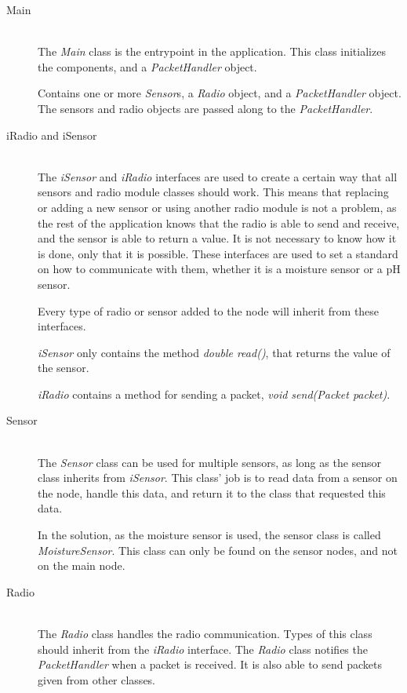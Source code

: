 \begin{description}
\item[Main] \hfill \\
The \textit{Main} class is the entrypoint in the application. This class initializes the components, and a \textit{PacketHandler} object.

Contains one or more \textit{Sensor}s, a \textit{Radio} object, and a \textit{PacketHandler} object. The sensors and radio objects are passed along to the \textit{PacketHandler}.

\item[iRadio and iSensor] \hfill \\
The \textit{iSensor} and \textit{iRadio} interfaces are used to create a certain way that all sensors and radio module classes should work. This means that replacing or adding a new sensor or using another radio module is not a problem, as the rest of the application knows that the radio is able to send and receive, and the sensor is able to return a value. 
It is not necessary to know how it is done, only that it is possible. These interfaces are used to set a standard on how to communicate with them, whether it is a moisture sensor or a pH sensor.

Every type of radio or sensor added to the node will inherit from these interfaces.


\textit{iSensor} only contains the method \textit{double read()}, that returns the value of the sensor. 

\textit{iRadio} contains a method for sending a packet, \textit{void send(Packet packet)}. 

\item[Sensor] \hfill \\
The \textit{Sensor} class can be used for multiple sensors, as long as the sensor class inherits from \textit{iSensor}. This class' job is to read data from a sensor on the node, handle this data, and return it to the class that requested this data.

In the solution, as the moisture sensor is used, the sensor class is called \textit{MoistureSensor}. This class can only be found on the sensor nodes, and not on the main node.


\item[Radio] \hfill \\
The \textit{Radio} class handles the radio communication. Types of this class should inherit from the \textit{iRadio} interface. The \textit{Radio} class notifies the \textit{PacketHandler} when a packet is received. It is also able to send packets given from other classes.


\end{description}
